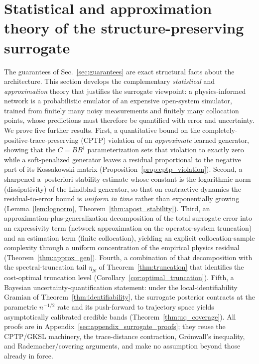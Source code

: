 \documentclass[twocolumn,aps,prxquantum,superscriptaddress,nofootinbib,floatfix,longbibliography]{revtex4-2}
\begin{document}
\section{Statistical and approximation theory of the structure-preserving surrogate}
\label{sec:surrogate_theory}

The guarantees of Sec.~\ref{sec:guarantees} are exact structural facts about the architecture. This section develops the complementary \emph{statistical} and \emph{approximation} theory that justifies the surrogate viewpoint: a physics-informed network is a probabilistic emulator of an expensive open-system simulator, trained from finitely many noisy measurements and finitely many collocation points, whose predictions must therefore be quantified with error and uncertainty. We prove five further results. First, a quantitative bound on the completely-positive-trace-preserving (CPTP) violation of an \emph{approximate} learned generator, showing that the $C=BB^\dagger$ parameterization sets that violation to exactly zero while a soft-penalized generator leaves a residual proportional to the negative part of its Kossakowski matrix (Proposition~\ref{prop:cptp_violation}). Second, a sharpened a~posteriori stability estimate whose constant is the logarithmic norm (dissipativity) of the Lindblad generator, so that on contractive dynamics the residual-to-error bound is \emph{uniform in time} rather than exponentially growing (Lemma~\ref{lem:lognorm}, Theorem~\ref{thm:apost_stability}). Third, an approximation-plus-generalization decomposition of the total surrogate error into an expressivity term (network approximation on the operator-system truncation) and an estimation term (finite collocation), yielding an explicit collocation-sample complexity through a uniform concentration of the empirical physics residual (Theorem~\ref{thm:approx_gen}). Fourth, a combination of that decomposition with the spectral-truncation tail $\eta_N$ of Theorem~\ref{thm:truncation} that identifies the cost-optimal truncation level (Corollary~\ref{cor:optimal_truncation}). Fifth, a Bayesian uncertainty-quantification statement: under the local-identifiability Gramian of Theorem~\ref{thm:identifiability}, the surrogate posterior contracts at the parametric $n^{-1/2}$ rate and its push-forward to trajectory space yields asymptotically calibrated credible bands (Theorem~\ref{thm:uq_coverage}). All proofs are in Appendix~\ref{sec:appendix_surrogate_proofs}; they reuse the CPTP/GKSL machinery, the trace-distance contraction, Gr\"onwall's inequality, and Rademacher/covering arguments, and make no assumption beyond those already in force.
\end{document}
